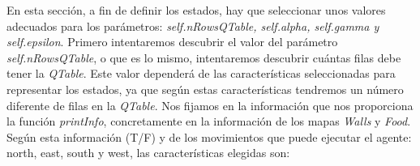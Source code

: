 \documentclass[11pt]{exam}
\begin{document}
En esta sección, a fin de definir los estados, hay que seleccionar unos valores adecuados para los parámetros: \textit{self.nRowsQTable, self.alpha, self.gamma y self.epsilon}. Primero intentaremos descubrir el valor del parámetro \textit{self.nRowsQTable}, o que es lo mismo, intentaremos descubrir cuántas filas debe tener la \textit{QTable}. Este valor dependerá de las características seleccionadas para representar los estados, ya que según estas características tendremos un número diferente de filas en la \textit{QTable}. Nos fijamos en la información que nos proporciona la función \textit{printInfo}, concretamente en la información de los mapas \textit{Walls} y \textit{Food}. Según esta información (T/F) y de los movimientos que puede ejecutar el agente: north, east, south y west, las características elegidas son:

\begin{parcolumns}{2}
	\colplacechunks
\end{parcolumns}
\vspace*{3mm}
\end{document}
